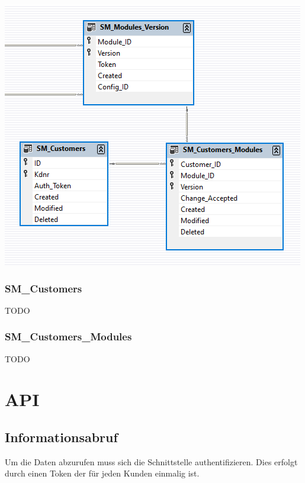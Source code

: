 \documentclass{article}
\begin{document}
\begin{center}
\includegraphics{db_customers}
\end{center}

\subsubsection{SM\_Customers}
TODO

\subsubsection{SM\_Customers\_Modules}
TODO

\newpage

\section{API}
\label{sec:sm.api}

\subsection{Informationsabruf}

Um die Daten abzurufen muss sich die Schnittstelle authentifizieren. Dies erfolgt durch einen Token der für jeden Kunden einmalig ist.
\end{document}
